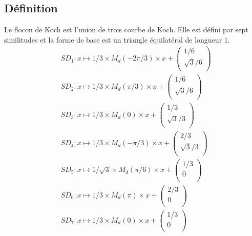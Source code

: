 \documentclass[a4paper, 12pt]{report}
\begin{document}
			\subsection{Définition}
				Le flocon de Koch est l'union de trois courbe de Koch. Elle est défini par sept similitudes et la forme de base est un triangle équilatéral de longueur $1$.
				\begin{align*}
					&SD_1:x\mapsto 1/3\times M_d(-2\pi/3)\times x+\left(	\begin{array}{ccc}
															1/6\\
															\sqrt{3}/6\\
														\end{array}\right)\\
					&SD_2:x\mapsto 1/3\times M_d(\pi/3)\times x+\left(	\begin{array}{ccc}
															1/6\\
															\sqrt{3}/6\\
														\end{array}\right)\\
					&SD_3:x\mapsto 1/3\times M_d(0)\times x+\left(	\begin{array}{ccc}
															1/3\\
															\sqrt{3}/3\\
														\end{array}\right)\\
					&SD_4:x\mapsto 1/3\times M_d(-\pi/3)\times x+\left(	\begin{array}{ccc}
															2/3\\
															\sqrt{3}/3\\
														\end{array}\right)\\
					&SD_5:x\mapsto 1/\sqrt{3}\times M_d(\pi/6)\times x+\left(	\begin{array}{ccc}
															1/3\\
															0\\
														\end{array}\right)\\
					&SD_6:x\mapsto 1/3\times M_d(\pi)\times x+\left(	\begin{array}{ccc}
															2/3\\
															0\\
														\end{array}\right)\\
					&SD_7:x\mapsto 1/3\times M_d(0)\times x+\left(	\begin{array}{ccc}
															1/3\\
															0\\
														\end{array}\right)
				\end{align*}
\end{document}
